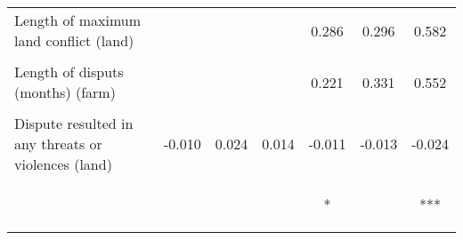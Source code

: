 \begin{tabular}{lcccccc}
\noalign{\smallskip}Length of maximum land conflict (land) &  &  &  & 0.286 & 0.296 & 0.582\\
 & \begin{footnotesize}\end{footnotesize} & \begin{footnotesize}\end{footnotesize} & \begin{footnotesize}\end{footnotesize} & \begin{footnotesize}[0.289]\end{footnotesize} & \begin{footnotesize}[0.578]\end{footnotesize} & \begin{footnotesize}[0.571]\end{footnotesize}\\
\noalign{\smallskip}Length of disputs (months) (farm) &  &  &  & 0.221 & 0.331 & 0.552\\
 & \begin{footnotesize}\end{footnotesize} & \begin{footnotesize}\end{footnotesize} & \begin{footnotesize}\end{footnotesize} & \begin{footnotesize}[0.238]\end{footnotesize} & \begin{footnotesize}[0.489]\end{footnotesize} & \begin{footnotesize}[0.494]\end{footnotesize}\\
\noalign{\smallskip}Dispute resulted in any threats or violences (land) & -0.010 & 0.024 & 0.014 & -0.011 & -0.013 & -0.024\\
 & \begin{footnotesize}[0.012]\end{footnotesize} & \begin{footnotesize}[0.018]\end{footnotesize} & \begin{footnotesize}[0.017]\end{footnotesize} & \begin{footnotesize}[0.006]*\end{footnotesize} & \begin{footnotesize}[0.009]\end{footnotesize} & \begin{footnotesize}[0.009]***\end{footnotesize}\\

\end{tabular}
